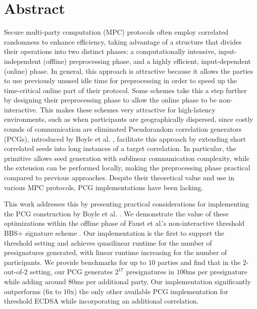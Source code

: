 \section*{Abstract}
Secure multi-party computation (MPC) protocols often employ correlated randomness to enhance efficiency, taking advantage of a structure that divides their operations into two distinct phases: a computationally intensive, input-independent (offline) preprocessing phase, and a highly efficient, input-dependent (online) phase. In general, this approach is attractive because it allows the parties to use previously unused idle time for preprocessing in order to speed up the time-critical online part of their protocol. Some schemes take this a step further by designing their preprocessing phase to allow the online phase to be non-interactive. This makes these schemes very attractive for high-latency environments, such as when participants are geographically dispersed, since costly rounds of communication are eliminated Pseudorandom correlation generators (PCGs), introduced by Boyle et al. \cite{boyle2019efficient, boyle2020efficient}, facilitate this approach by extending short correlated seeds into long instances of a target correlation. In particular, the primitive allows seed generation with sublinear communication complexity, while the extension can be performed locally, making the preprocessing phase practical compared to previous approaches. Despite their theoretical value and use in various MPC protocols, PCG implementations have been lacking. 

This work addresses this by presenting practical considerations for implementing the PCG construction by Boyle et al. \cite{boyle2020efficient}. We demonstrate the value of these optimizations within the offline phase of Faust et al.'s non-interactive threshold BBS+ signature scheme \cite{faust2023non}. Our implementation is the first to support the threshold setting and achieves quasilinear runtime for the number of presignatures generated, with linear runtime increasing for the number of participants. We provide benchmarks for up to $10$ parties and find that in the $2$-out-of-$2$ setting, our PCG generates $2^{17}$ presignatures in $100$ms per presignature while adding around $80$ms per additional party. Our implementation significantly outperforms ($6$x to $10$x) the only other available PCG implementation for threshold ECDSA \cite{abram2022low} while incorporating an additional correlation.